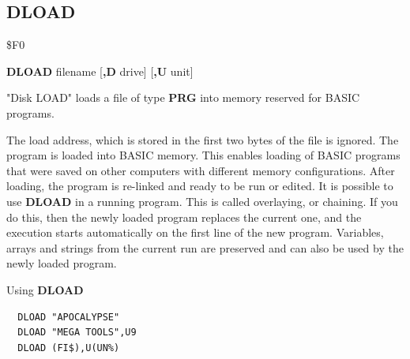 
\newpage
\subsection{DLOAD}
\begin{description}[leftmargin=2cm,style=nextline]
\item [Token:] \$F0
\item [Format:] {\bf DLOAD} filename [{\bf,D} drive] [{\bf,U} unit]
\item [Usage:]
   "Disk LOAD" loads a file of type
   {\bf PRG} into memory reserved for BASIC programs.

   \filenamedefinition

   \drivedefinition

   \unitdefinition

\item [Remarks:]
   The load address, which is stored in the first two bytes
   of the file is ignored. The program is loaded into
   BASIC memory. This enables loading of BASIC programs
   that were saved on other computers with different memory
   configurations. After loading, the program is re-linked
   and ready to be run or edited.
   It is possible to use {\bf DLOAD} in a running program. This is
   called overlaying, or chaining.
   If you do this, then the newly loaded program replaces the current one,
   and the execution starts automatically on the first line of the
   new program. Variables, arrays and strings from the current
   run are preserved and can also be used by the newly loaded program.

\item [Examples:] Using {\bf DLOAD}
\begin{tcolorbox}[colback=black,coltext=white]
\verbatimfont{\codefont}
\begin{verbatim}
  DLOAD "APOCALYPSE"
  DLOAD "MEGA TOOLS",U9
  DLOAD (FI$),U(UN%)
\end{verbatim}
\end{tcolorbox}
\end{description}


\newpage

